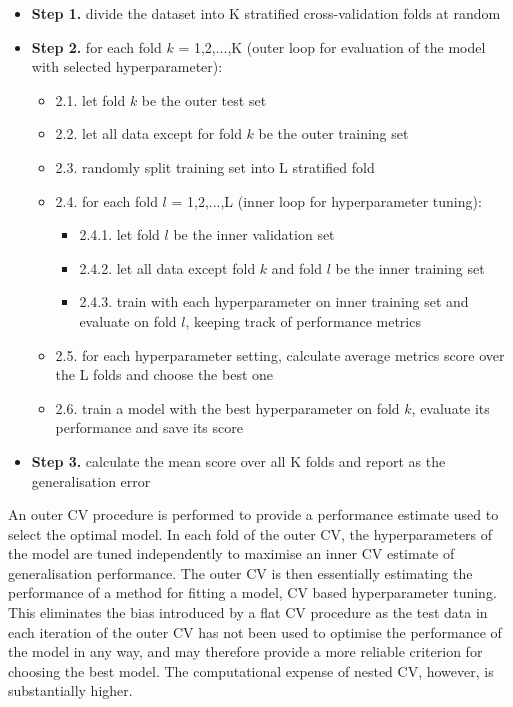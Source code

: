\begin{itemize}[label={}]
  \item \textbf{Step 1.} divide the dataset into K stratified cross-validation folds at random
  \item \textbf{Step 2.} for each fold $k$ = 1,2,...,K (outer loop for evaluation of the model with selected hyperparameter):
        \begin{itemize}[label={}]
          \item 2.1. let fold $k$ be the outer test set
          \item 2.2. let all data except for fold $k$ be the outer training set
          \item 2.3. randomly split training set into L stratified fold
          \item 2.4. for each fold $l$ = 1,2,...,L (inner loop for hyperparameter tuning):
                \begin{itemize}[label={}]
                  \item 2.4.1. let fold $l$ be the inner validation set
                  \item 2.4.2. let all data except fold $k$ and fold $l$ be the inner training set
                  \item 2.4.3. train with each hyperparameter on inner training set and evaluate on fold $l$, keeping track of performance metrics
                \end{itemize}
          \item 2.5. for each hyperparameter setting, calculate average metrics score over the L folds and choose the best one
          \item 2.6. train a model with the best hyperparameter on fold $k$, evaluate its performance and save its score
        \end{itemize}
  \item \textbf{Step 3.} calculate the mean score over all K folds and report as the generalisation error
\end{itemize} \bigskip

An outer CV procedure is performed to provide a performance estimate used to select the optimal model. In each fold of the outer CV, the hyperparameters of the model are tuned independently to maximise an inner CV estimate of generalisation performance. The outer CV is then essentially estimating the performance of a method for fitting a model, CV based hyperparameter tuning. This eliminates the bias introduced by a flat CV procedure as the test data in each iteration of the outer CV has not been used to optimise the performance of the model in any way, and may therefore provide a more reliable criterion for choosing the best model. The computational expense of nested CV, however, is substantially higher. \\



